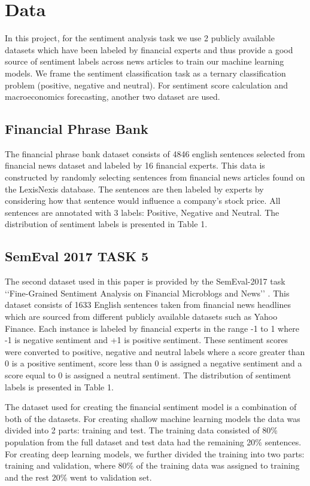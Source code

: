 \documentclass[11pt,a4paper]{article}
\begin{document}
\section{Data}

In this project, for the sentiment analysis task we use 2 publicly available datasets which have been labeled by financial experts and thus provide a good source of sentiment labels across news articles to train our machine learning models. We frame the sentiment classification task as a ternary classification problem (positive, negative and neutral).
For sentiment score calculation and macroeconomics forecasting, another two dataset are used.

\subsection{Financial Phrase Bank}

The financial phrase bank dataset \cite{P2} consists of 4846 english sentences selected from financial news dataset and labeled by 16 financial experts. This data is constructed by randomly selecting sentences from financial news articles found on the LexisNexis database. The sentences are then labeled by experts by considering how that sentence would influence a company's stock price. All sentences are annotated with 3 labels: Positive, Negative and Neutral. The distribution of sentiment labels is presented in Table 1.


\subsection{SemEval 2017 TASK 5}

The second dataset used in this paper is provided by the SemEval-2017 task ‘‘Fine-Grained Sentiment Analysis on Financial Microblogs and News’’  \cite{P8}. This dataset consists of 1633 English sentences taken from financial news headlines which are sourced from different publicly available datasets such as Yahoo Finance. Each instance is labeled by financial experts in the range -1 to 1 where -1 is negative sentiment and +1 is positive sentiment. These sentiment scores were converted to positive, negative and neutral labels where a score greater than 0 is a positive sentiment, score less than 0 is assigned a negative sentiment and a score equal to 0 is assigned a neutral sentiment. The distribution of sentiment labels is presented in Table 1.


The dataset used for creating the financial sentiment model is a combination of both of the datasets. For creating shallow machine learning models the data was divided into 2 parts: training and test. The training data consisted of 80\% population from the full dataset and test data had the remaining 20\% sentences. For creating deep learning models, we further divided the training into two parts: training and validation, where 80\% of the training data was assigned to training and the rest 20\% went to validation set.
\end{document}
